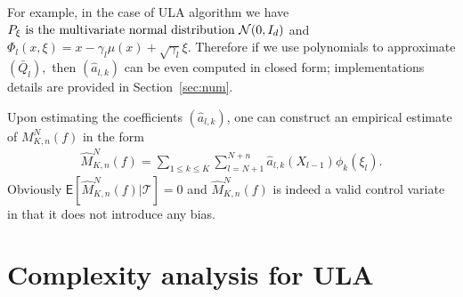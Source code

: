 \documentclass[preprint]{imsart}
\def\TrainSet{\mathcal{T}}
\begin{document}
 For example, in the case of ULA algorithm we have \(P_\xi$ is the multivariate normal distribution $ \mathcal{N}(0,I_d)\) and \(\Phi_l(x,\xi)=x-\gamma_{l}\mu(x)+\sqrt{\gamma_{l}}\xi.\) Therefore if we use polynomials to approximate \((\bar Q_{l}),\) then \((\widehat a_{l,k})\) can be even computed in closed form; implementations details are provided in  Section~\ref{sec:num}.

Upon estimating  the coefficients \((\widehat a_{l,k})\), one can construct an empirical estimate  of \(M_{K,n}^N(f)\) in the form
\begin{eqnarray*}
\widehat M_{K,n}^N(f) =\sum_{1\leq  k \le K}\sum_{l=N+1}^{N+n}\widehat a_{l,k}(X_{l-1})\phi_k(\xi_{l}).
\end{eqnarray*}
Obviously \(\mathsf{E}[\widehat M_{K,n}^N(f)|\TrainSet]=0\) and \(\widehat M_{K,n}^N(f)\) is indeed a valid control variate in that it
does not introduce any bias.

\section{Complexity analysis for ULA}
\label{sec:coeff}
\end{document}
